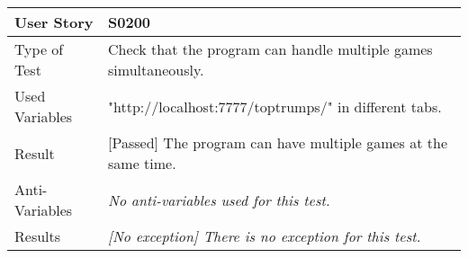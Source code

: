 \begin{tabular}{l | p{12cm}}
User Story & \textbf{S0200}\\ \hline
Type of Test & Check that the program can handle multiple games simultaneously.\\ \hline
Used Variables & "http://localhost:7777/toptrumps/" in different tabs.\\ \hline
Result & [Passed] The program can have multiple games at the same time.\\ \hline
Anti-Variables & \emph{No anti-variables used for this test.}\\ \hline
Results & \emph{[No exception] There is no exception for this test.}\\ \hline
\end{tabular}\\
